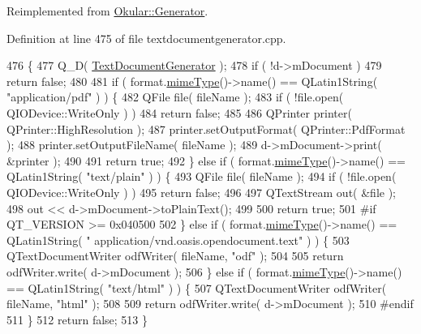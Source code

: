 Reimplemented from \hyperlink{classOkular_1_1Generator_a9e78f37aafbfdaf04f76f4163c27aa5e}{Okular\+::\+Generator}.



Definition at line 475 of file textdocumentgenerator.\+cpp.


\begin{DoxyCode}
476 \{
477     Q\_D( \hyperlink{classOkular_1_1TextDocumentGenerator}{TextDocumentGenerator} );
478     \textcolor{keywordflow}{if} ( !d->mDocument )
479         \textcolor{keywordflow}{return} \textcolor{keyword}{false};
480 
481     \textcolor{keywordflow}{if} ( format.\hyperlink{classOkular_1_1ExportFormat_ab37ac9aa0c65cdff5e9666e1390d79de}{mimeType}()->name() == QLatin1String( \textcolor{stringliteral}{"application/pdf"} ) ) \{
482         QFile file( fileName );
483         \textcolor{keywordflow}{if} ( !file.open( QIODevice::WriteOnly ) )
484             \textcolor{keywordflow}{return} \textcolor{keyword}{false};
485 
486         QPrinter printer( QPrinter::HighResolution );
487         printer.setOutputFormat( QPrinter::PdfFormat );
488         printer.setOutputFileName( fileName );
489         d->mDocument->print( &printer );
490 
491         \textcolor{keywordflow}{return} \textcolor{keyword}{true};
492     \} \textcolor{keywordflow}{else} \textcolor{keywordflow}{if} ( format.\hyperlink{classOkular_1_1ExportFormat_ab37ac9aa0c65cdff5e9666e1390d79de}{mimeType}()->name() == QLatin1String( \textcolor{stringliteral}{"text/plain"} ) ) \{
493         QFile file( fileName );
494         \textcolor{keywordflow}{if} ( !file.open( QIODevice::WriteOnly ) )
495             \textcolor{keywordflow}{return} \textcolor{keyword}{false};
496 
497         QTextStream out( &file );
498         out << d->mDocument->toPlainText();
499 
500         \textcolor{keywordflow}{return} \textcolor{keyword}{true};
501 \textcolor{preprocessor}{#if QT\_VERSION >= 0x040500}
502     \} \textcolor{keywordflow}{else} \textcolor{keywordflow}{if} ( format.\hyperlink{classOkular_1_1ExportFormat_ab37ac9aa0c65cdff5e9666e1390d79de}{mimeType}()->name() == QLatin1String( \textcolor{stringliteral}{"
      application/vnd.oasis.opendocument.text"} ) ) \{
503         QTextDocumentWriter odfWriter( fileName, \textcolor{stringliteral}{"odf"} );
504 
505         \textcolor{keywordflow}{return} odfWriter.write( d->mDocument );
506     \} \textcolor{keywordflow}{else} \textcolor{keywordflow}{if} ( format.\hyperlink{classOkular_1_1ExportFormat_ab37ac9aa0c65cdff5e9666e1390d79de}{mimeType}()->name() == QLatin1String( \textcolor{stringliteral}{"text/html"} ) ) \{
507         QTextDocumentWriter odfWriter( fileName, \textcolor{stringliteral}{"html"} );
508 
509         \textcolor{keywordflow}{return} odfWriter.write( d->mDocument );
510 \textcolor{preprocessor}{#endif}
511     \}
512     \textcolor{keywordflow}{return} \textcolor{keyword}{false};
513 \}
\end{DoxyCode}
